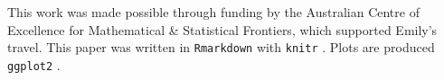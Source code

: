 This work was made possible through funding by the Australian Centre of
Excellence for Mathematical \& Statistical Frontiers, which supported
Emily's travel. This paper was written in \texttt{Rmarkdown}
\citep{rmarkdown_pkg, rmarkdown, rmarkdown_cookbook} with \texttt{knitr}
\citep{knitr_pkg, knitr}. Plots are produced \texttt{ggplot2}
\citep{ggplot2}.

\clearpage




\address{%
Weihao Li\\
Monash University\\%
Econometrics and Business Statistics\\
%
%
%
\\\href{mailto:weihao.li@monash.edu}{\nolinkurl{weihao.li@monash.edu}}
}

\address{%
Emily Dodwell\\
??\\%
line 1\\ line 2\\
%
%
%
\\\href{mailto:emdodwell@gmail.com}{\nolinkurl{emdodwell@gmail.com}}
}

\address{%
Dianne Cook\\
Monash University\\%
Econometrics and Business Statistics\\
%
%
%
\\\href{mailto:dicook@monash.edu}{\nolinkurl{dicook@monash.edu}}
}

